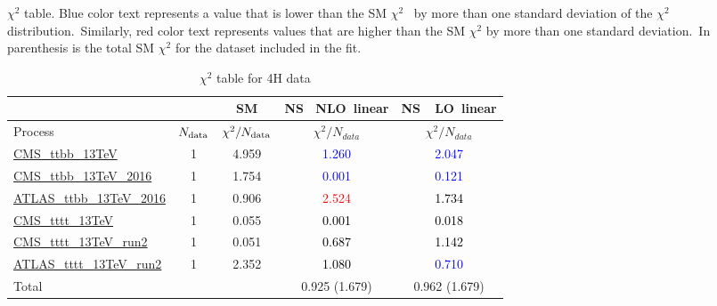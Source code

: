 \documentclass{article}
\begin{document}
$\chi^2$ table. Blue color text represents a value that is lower than the SM $\chi^2$ \
            by more than one standard deviation of the $\chi^2$ distribution.\
            Similarly, red color text represents values that are higher than the SM $\chi^2$ by more than one standard deviation.\
            In parenthesis is the total SM $\chi^2$ for the dataset included in the fit. \\
\begin{table}[H]
\centering
\begin{tabular}{|l|c|c|c|c|}
\hline
 \multicolumn{2}{|c|}{} & SM& \rm NS \ NLO\ linear& \rm NS\ \ LO\ linear\\ \hline
Process & $N_{\rm data}$ & $\chi^ 2/N_{\rm data}$& $\chi^ 2/N_{data}$& $\chi^ 2/N_{data}$\\ \hline
\href{https://arxiv.org/abs/1705.10141}{CMS_ttbb_13TeV} & 1 & 4.959 & \textcolor{blue}                            {1.260} & \textcolor{blue}                            {2.047} \\ \hline
\href{https://arxiv.org/abs/1909.05306}{CMS_ttbb_13TeV_2016} & 1 & 1.754 & \textcolor{blue}                            {0.001} & \textcolor{blue}                            {0.121} \\ \hline
\href{https://arxiv.org/abs/1811.12113}{ATLAS_ttbb_13TeV_2016} & 1 & 0.906 & \textcolor{red}                            {2.524} & \textcolor{black}                            {1.734} \\ \hline
\href{https://arxiv.org/abs/1710.10614}{CMS_tttt_13TeV} & 1 & 0.055 & \textcolor{black}                            {0.001} & \textcolor{black}                            {0.018} \\ \hline
\href{https://arxiv.org/abs/1908.06463}{CMS_tttt_13TeV_run2} & 1 & 0.051 & \textcolor{black}                            {0.687} & \textcolor{black}                            {1.142} \\ \hline
\href{https://arxiv.org/abs/2007.14858}{ATLAS_tttt_13TeV_run2} & 1 & 2.352 & \textcolor{black}                            {1.080} & \textcolor{blue}                            {0.710} \\ \hline
\hline Total & &  & 0.925 (1.679) & 0.962 (1.679) \\ \hline
\end{tabular}
\caption{$\chi^2$ table for 4H data}
\end{table}
\end{document}
